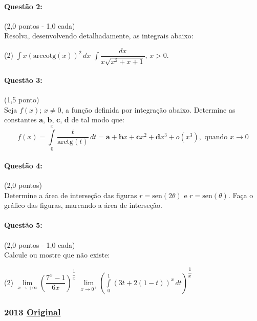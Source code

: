 \documentclass[12pt,a4paper]{article}
\newcommand{\sen}{\mathrm{sen}}
\newcommand{\original}[1]{\tiny \href{#1}{Original} \normalsize}
\begin{document}
\paragraph{Questão 2:}(2,0 pontos - 1,0 cada)\\
Resolva, desenvolvendo detalhadamente, as integrais abaixo:

\begin{tasks}(2)
\task $\displaystyle \int x(\textrm{arccotg} (x))^2 \,dx$
\task $\displaystyle \int \dfrac{dx}{x\sqrt{x^2+x+1}},\,x>0$.
\end{tasks}

\paragraph{Questão 3:}(1,5 ponto)\\
Seja $f(x);\,x\neq 0$, a função definida por integração abaixo. Determine as constantes $\textbf{a}$, $\textbf{b}$, $\textbf{c}$, $\textbf{d}$ de tal modo que:\\
$$f(x)=\displaystyle\int\limits_{0}^{x}\dfrac{t}{\textrm{arctg}(t)}\,dt=\textbf{a}+\textbf{b} x+\textbf{c} x^2+\textbf{d} x^3+o(x^3),\text{ quando }x \to 0$$

\paragraph{Questão 4:}(2,0 pontos)\\
Determine a área de interseção das figuras $r=\sen (2\theta)$ e $r=\sen (\theta)$. Faça o gráfico das figuras, marcando a área de interseção.

\paragraph{Questão 5:}(2,0 pontos - 1,0 cada)\\
Calcule ou mostre que não existe:

\begin{tasks}(2)
\task $\lim\limits_{x\to +\infty} \left ( \dfrac{7^x-1}{6x} \right )^{\dfrac{1}{x}}$
\task $\lim\limits_{x\to 0^+} \left ( \displaystyle\int\limits_{0}^{1}\left ( 3t+2\left (  1-t\right ) \right )^x \,dt \right )^{\dfrac{1}{x}}$
\end{tasks}
\newpage

\subsubsection{2013 \original{https://drive.google.com/open?id=1mwBzM5Y-JjrXpuzqZKSRQAmOa4J76RHq}}
\end{document}
